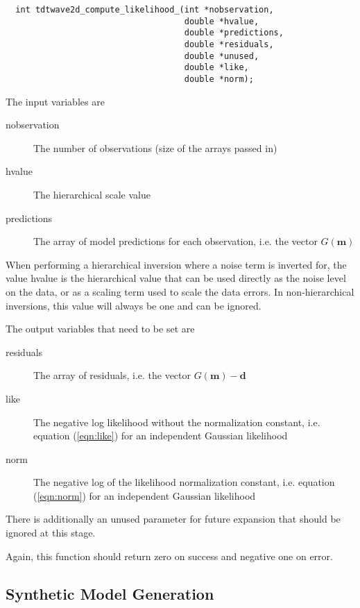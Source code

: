 \documentclass[a4paper,12pt]{article}
\begin{document}
\begin{verbatim}
  int tdtwave2d_compute_likelihood_(int *nobservation,
                                    double *hvalue,
                                    double *predictions,
                                    double *residuals,
                                    double *unused,
                                    double *like,
                                    double *norm);
\end{verbatim}

The input variables are

\begin{description}
\item[nobservation] The number of observations (size of the arrays passed in)
\item[hvalue] The hierarchical scale value
\item[predictions] The array of model predictions for each observation, i.e. the vector $G(\mathbf{m})$
\end{description}

When performing a hierarchical inversion where a noise term is
inverted for, the value hvalue is the hierarchical value that can be
used directly as the noise level on the data, or as a scaling term
used to scale the data errors. In non-hierarchical inversions, this value
will always be one and can be ignored.

The output variables that need to be set are

\begin{description}
\item[residuals] The array of residuals, i.e. the vector $G(\mathbf{m}) - \mathbf{d}$
\item[like] The negative log likelihood without the normalization constant, i.e. equation (\ref{eqn:like})
  for an independent Gaussian likelihood
\item[norm] The negative log of the likelihood normalization constant, i.e. equation (\ref{eqn:norm})
  for an independent Gaussian likelihood
\end{description}

There is additionally an unused parameter for future expansion that should be ignored
at this stage.

Again, this function should return zero on success and negative one on error.

\subsection{Synthetic Model Generation}
\end{document}
